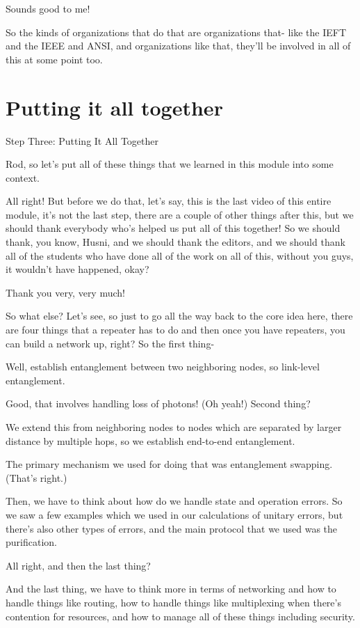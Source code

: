 Sounds good to me!

So the kinds of organizations that do that are organizations that- like the IEFT and the IEEE and ANSI, and organizations like that, they'll be involved in all of this at some point too.


\section{Putting it all together}

Step Three: Putting It All Together

Rod, so let's put all of these things that we learned in this module into some context.

All right! But before we do that, let's say, this is the last video of this entire module, it's not the last step, there are a couple of other things after this, but we should thank everybody who's helped us put all of this together! So we should thank, you know, Husni, and we should thank the editors, and we should thank all of the students who have done all of the work on all of this, without you guys, it wouldn't have happened, okay?

Thank you very, very much!

So what else? Let's see, so just to go all the way back to the core idea here, there are four things that a repeater has to do and then once you have repeaters, you can build a network up, right? So the first thing-

Well, establish entanglement between two neighboring nodes, so link-level entanglement.

Good, that involves handling loss of photons! (Oh yeah!) Second thing?

We extend this from neighboring nodes to nodes which are separated by larger distance by multiple hops, so we establish end-to-end entanglement.

The primary mechanism we used for doing that was entanglement swapping. (That's right.)

Then, we have to think about how do we handle state and operation errors. So we saw a few examples which we used in our calculations of unitary errors, but there's also other types of errors, and the main protocol that we used was the purification.

All right, and then the last thing?

And the last thing, we have to think more in terms of networking and how to handle things like routing, how to handle things like multiplexing when there's contention for resources, and how to manage all of these things including security.

